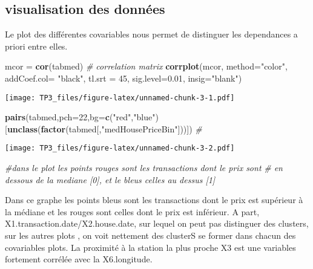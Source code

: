 \documentclass[
]{article}
\newenvironment{Shaded}{\begin{snugshade}}{\end{snugshade}}
\newcommand{\CommentTok}[1]{\textcolor[rgb]{0.56,0.35,0.01}{\textit{#1}}}
\newcommand{\DataTypeTok}[1]{\textcolor[rgb]{0.13,0.29,0.53}{#1}}
\newcommand{\DecValTok}[1]{\textcolor[rgb]{0.00,0.00,0.81}{#1}}
\newcommand{\FloatTok}[1]{\textcolor[rgb]{0.00,0.00,0.81}{#1}}
\newcommand{\KeywordTok}[1]{\textcolor[rgb]{0.13,0.29,0.53}{\textbf{#1}}}
\newcommand{\NormalTok}[1]{#1}
\newcommand{\StringTok}[1]{\textcolor[rgb]{0.31,0.60,0.02}{#1}}
\begin{document}
\hypertarget{visualisation-des-donnuxe9es}{%
\subsection{visualisation des
données}\label{visualisation-des-donnuxe9es}}

Le plot des différentes covariables nous permet de distinguer les
dependances a priori entre elles.

\begin{Shaded}
\begin{Highlighting}[]
\NormalTok{mcor =}\StringTok{ }\KeywordTok{cor}\NormalTok{(tabmed) }\CommentTok{# correlation matrix}
\KeywordTok{corrplot}\NormalTok{(mcor, }\DataTypeTok{method=}\StringTok{"color"}\NormalTok{, }\DataTypeTok{addCoef.col=} \StringTok{"black"}\NormalTok{, }\DataTypeTok{tl.srt =}
\DecValTok{45}\NormalTok{, }\DataTypeTok{sig.level=}\FloatTok{0.01}\NormalTok{, }\DataTypeTok{insig=}\StringTok{"blank"}\NormalTok{)}
\end{Highlighting}
\end{Shaded}

\texttt{[image: TP3\_files/figure-latex/unnamed-chunk-3-1.pdf]}

\begin{Shaded}
\begin{Highlighting}[]
\KeywordTok{pairs}\NormalTok{(tabmed,}\DataTypeTok{pch=}\DecValTok{22}\NormalTok{,}\DataTypeTok{bg=}\KeywordTok{c}\NormalTok{(}\StringTok{"red"}\NormalTok{,}\StringTok{"blue"}\NormalTok{)[}\KeywordTok{unclass}\NormalTok{(}\KeywordTok{factor}\NormalTok{(tabmed[,}\StringTok{"medHousePriceBin"}\NormalTok{]))]) }\CommentTok{# }
\end{Highlighting}
\end{Shaded}

\texttt{[image: TP3\_files/figure-latex/unnamed-chunk-3-2.pdf]}

\begin{Shaded}
\begin{Highlighting}[]
\CommentTok{#dans le plot les points rouges sont les transactions dont le prix sont}
\CommentTok{# en dessous de la mediane [0], et le bleus celles au dessus [1]}
\end{Highlighting}
\end{Shaded}

Dans ce graphe les points bleus sont les transactions dont le prix est
supérieur à la médiane et les rouges sont celles dont le prix est
inférieur. A part, X1.transaction.date/X2.house.date, sur lequel on peut
pas distinguer des clusters, sur les autres plots , on voit nettement
des clusterS se former dans chacun des covariables plots. La proximité à
la station la plus proche X3 est une variables fortement corrélée avec
la X6.longitude.
\end{document}
